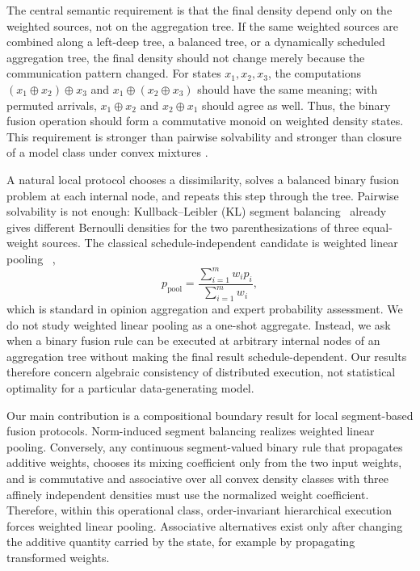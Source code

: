 \documentclass[runningheads]{llncs}
\begin{document}
The central semantic requirement is that the final density depend only on the
weighted sources, not on the aggregation tree. If the same weighted sources are combined along a left-deep tree, a balanced tree, or a dynamically scheduled aggregation tree, the final density should not change merely because the communication pattern changed. For states $x_1,x_2,x_3$, the computations $(x_1\oplus x_2)\oplus x_3$ and $x_1\oplus(x_2\oplus x_3)$ should have the same meaning; with permuted arrivals, $x_1\oplus x_2$ and $x_2\oplus x_1$ should agree as well. Thus, the binary fusion operation should form a commutative monoid on weighted density states. This requirement is stronger than pairwise solvability and stronger than closure of a model class under convex mixtures \cite{grabisch2009aggregation}.

A natural local protocol chooses a dissimilarity, solves a balanced binary fusion problem at each internal node, and repeats this step through the tree. Pairwise solvability is not enough: Kullback--Leibler (KL) segment balancing~\cite{kullback1951information} already gives different Bernoulli densities for the two parenthesizations of three equal-weight sources. The classical schedule-independent candidate is weighted linear pooling ~\cite{stone1961opinion,genest1986combining,jacobs1995methods},
\begin{equation}
  p_{\mathrm{pool}}=\frac{\sum_{i=1}^m w_i p_i}{\sum_{i=1}^m w_i},
  \label{eq:pooling-intro}
\end{equation}
which is standard in opinion aggregation and expert probability assessment. We do not study weighted linear pooling as a one-shot aggregate. Instead, we ask
when a binary fusion rule can be executed at arbitrary internal nodes of an
aggregation tree without making the final result schedule-dependent. Our results
therefore concern algebraic consistency of distributed execution, not statistical
optimality for a particular data-generating model.

Our main contribution is a compositional boundary result for local segment-based
fusion protocols. Norm-induced segment balancing realizes weighted linear
pooling. Conversely, any continuous segment-valued binary rule that propagates
additive weights, chooses its mixing coefficient only from the two input weights,
and is commutative and associative over all convex density classes with three
affinely independent densities must use the normalized weight coefficient.
Therefore, within this operational class, order-invariant hierarchical execution
forces weighted linear pooling. Associative alternatives
exist only after changing the additive quantity carried by the state, for example
by propagating transformed weights.
\end{document}
